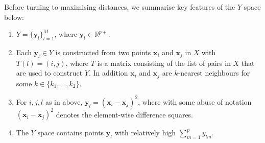 \documentclass[11pt]{article}
\begin{document}
Before turning to maximising distances, we summarise  key features of the $Y$ space below:
\begin{enumerate}
    \item $Y = \{\bm{y}_l \}_{l=1}^M$, where $\bm{y}_l \in \mathbb{R}^{p+}$.
    \item Each $\bm{y}_l \in Y$ is constructed from two points $\bm{x}_i$ and $\bm{x}_j$ in $X$ with $T(l) = (i,j)$, where $T$ is a matrix consisting of the list of pairs in $X$ that are used to construct $Y$. In addition $\bm{x}_i$ and $\bm{x}_j$ are $k$-nearest neighbours for some $k \in \{k_1, \ldots, k_2\}$.
    \item For $i,j,l$ as in above,  $\bm{y}_l = \left(\bm{x}_i - \bm{x}_j \right)^2$, where with some abuse of notation $\left(\bm{x}_i - \bm{x}_j \right)^2$ denotes the element-wise difference squares. 
    \item The $Y$ space contains points $\bm{y}_l$ with relatively high $\sum_{m=1}^p y_{lm}$.  
\end{enumerate}
\end{document}
